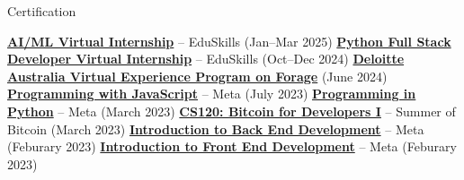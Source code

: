 \begin{rubric}{Certification}
%

\entry* \textbf{\href{https://aictecert.eduskillsfoundation.org/pages/home/verify.php?cert=6b5455ba9d313e658b8534b369dd7bcc}{AI/ML Virtual Internship}} -- EduSkills (Jan--Mar 2025)
\entry* \textbf{\href{https://aictecert.eduskillsfoundation.org/pages/home/verify.php?cert=0c3de61605156f8103e1dd3fc35125b5}{Python Full Stack Developer Virtual Internship}} -- EduSkills (Oct--Dec 2024)
\entry* \textbf{\href{}{Deloitte Australia Virtual Experience Program on Forage}} (June 2024)
\entry* \textbf{\href{https://www.coursera.org/account/accomplishments/certificate/KRPMDEJ7BX88}{Programming with JavaScript}} -- Meta (July 2023)
\entry* \textbf{\href{https://www.coursera.org/account/accomplishments/certificate/E8UQGESEMZSN}{Programming in Python}} -- Meta (March 2023)
\entry* \textbf{\href{https://learn.saylor.org/admin/tool/certificate/index.php?code=1181386757AS}{CS120: Bitcoin for Developers I}} -- Summer of Bitcoin (March 2023)
\entry* \textbf{\href{https://www.coursera.org/account/accomplishments/certificate/JDY3PU38E35H}{Introduction to Back End Development}} -- Meta (Feburary 2023)
\entry* \textbf{\href{https://www.coursera.org/account/accomplishments/certificate/5ELZKP4XELU8}{Introduction to Front End Development}} -- Meta (Feburary 2023)


\end{rubric}